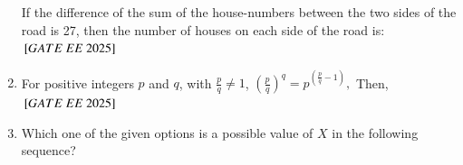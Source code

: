 \documentclass[journal,12pt,onecolumn]{IEEEtran}
\theoremstyle{remark}
\begin{document}
\begin{enumerate}
If the difference of the sum of the house-numbers between the two sides of the road is 27, then the number of houses on each side of the road is: \\
   \hfill ${}\left[GATE\ EE\ 2025\right]$
       \begin{enumerate}
  \end{enumerate}
   \item For positive integers $ p $ and $ q $, with $ \frac{p}{q} \neq 1 $, 
$\left( \frac{p}{q} \right)^q = p^{\left( \frac{p}{q} - 1 \right)},$
Then,\\
\hfill ${}\left[GATE\ EE\ 2025\right]$
    \begin{enumerate}
  \end{enumerate}
 
\item  Which one of the given options is a possible value of $ X $ in the following sequence?



\end{enumerate}
\end{document}
